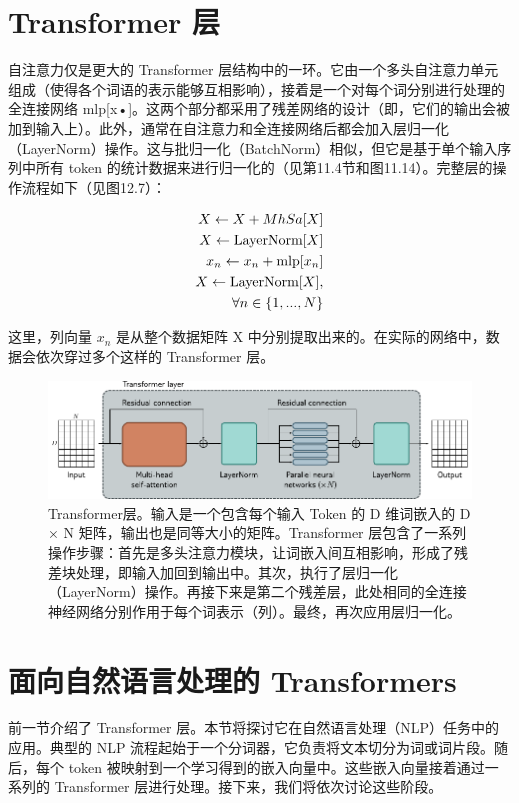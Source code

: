 \documentclass[lang=cn,newtx,10pt,scheme=chinese]{elegantbook}
\begin{document}
\section{Transformer 层}
自注意力仅是更大的 Transformer 层结构中的一环。它由一个多头自注意力单元组成（使得各个词语的表示能够互相影响），接着是一个对每个词分别进行处理的全连接网络 mlp[x•]。这两个部分都采用了残差网络的设计（即，它们的输出会被加到输入上）。此外，通常在自注意力和全连接网络后都会加入层归一化（LayerNorm）操作。这与批归一化（BatchNorm）相似，但它是基于单个输入序列中所有 token 的统计数据来进行归一化的（见第11.4节和图11.14）。完整层的操作流程如下（见图12.7）：

\begin{align}
X \leftarrow X + MhSa[X] \notag \\
X \leftarrow \text{LayerNorm}[X] \notag \\
x_n \leftarrow x_n + \text{mlp}[x_n] \notag \\
X \leftarrow \text{LayerNorm}[X], \notag \\
\quad \forall n \in \{1,...,N\} 
\end{align} 


这里，列向量 \(x_n\) 是从整个数据矩阵 X 中分别提取出来的。在实际的网络中，数据会依次穿过多个这样的 Transformer 层。

\begin{figure}[ht!]
\centering
\includegraphics[width=0.7\linewidth]{PDFFigures/UDLChap12PDF/TransformerBlock.pdf}
\caption{Transformer层。输入是一个包含每个输入 Token 的 D 维词嵌入的 D × N 矩阵，输出也是同等大小的矩阵。Transformer 层包含了一系列操作步骤：首先是多头注意力模块，让词嵌入间互相影响，形成了残差块处理，即输入加回到输出中。其次，执行了层归一化（LayerNorm）操作。再接下来是第二个残差层，此处相同的全连接神经网络分别作用于每个词表示（列）。最终，再次应用层归一化。}
\end{figure}


\section{面向自然语言处理的 Transformers}

前一节介绍了 Transformer 层。本节将探讨它在自然语言处理（NLP）任务中的应用。典型的 NLP 流程起始于一个分词器，它负责将文本切分为词或词片段。随后，每个 token 被映射到一个学习得到的嵌入向量中。这些嵌入向量接着通过一系列的 Transformer 层进行处理。接下来，我们将依次讨论这些阶段。
\end{document}
